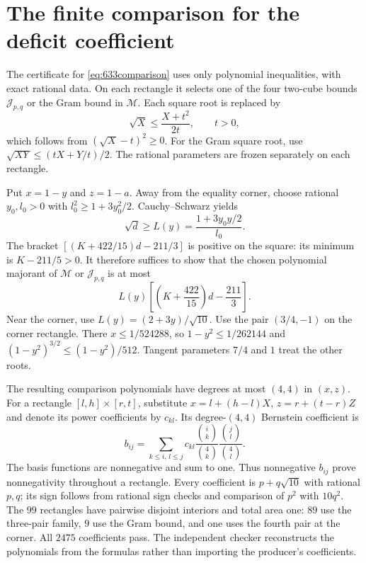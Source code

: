 \documentclass[11pt]{article}
\begin{document}
\appendix
\section{The finite comparison for the deficit coefficient}\label{app:633}
The certificate for \eqref{eq:633comparison} uses only polynomial inequalities, with exact rational data. On each rectangle it selects one of the four two-cube bounds $\mathcal J_{p,q}$ or the Gram bound in $\mathcal M$. Each square root is replaced by
\begin{equation*}
 \sqrt X\le\frac{X+t^2}{2t},\qquad t>0,
\end{equation*}
which follows from $(\sqrt X-t)^2\ge0$. For the Gram square root, use $\sqrt{XY}\le(tX+Y/t)/2$. The rational parameters are frozen separately on each rectangle.

Put $x=1-y$ and $z=1-a$. Away from the equality corner, choose rational $y_0,l_0>0$ with $l_0^2\ge1+3y_0^2/2$. Cauchy--Schwarz yields
\begin{equation*}
 \sqrt d\ge L(y)=\frac{1+3y_0y/2}{l_0}.
\end{equation*}
The bracket $[(K+422/15)d-211/3]$ is positive on the square: its minimum is $K-211/5>0$. It therefore suffices to show that the chosen polynomial majorant of $\mathcal M$ or $\mathcal J_{p,q}$ is at most
\begin{equation*}
 L(y)\left[\left(K+\frac{422}{15}\right)d-\frac{211}{3}\right].
\end{equation*}
Near the corner, use $L(y)=(2+3y)/\sqrt{10}$. Use the pair $(3/4,-1)$ on the corner rectangle. There $x\le1/524288$, so $1-y^2\le1/262144$ and $(1-y^2)^{3/2}\le(1-y^2)/512$. Tangent parameters $7/4$ and $1$ treat the other roots.

The resulting comparison polynomials have degrees at most $(4,4)$ in $(x,z)$. For a rectangle $[l,h]\times[r,t]$, substitute $x=l+(h-l)X$, $z=r+(t-r)Z$ and denote its power coefficients by $c_{kl}$. Its degree-$(4,4)$ Bernstein coefficient is
\begin{equation*}
 b_{ij}=\sum_{k\le i,\,l\le j}c_{kl}
 \frac{\binom{i}{k}}{\binom{4}{k}}
 \frac{\binom{j}{l}}{\binom{4}{l}}.
\end{equation*}
The basis functions are nonnegative and sum to one. Thus nonnegative $b_{ij}$ prove nonnegativity throughout a rectangle. Every coefficient is $p+q\sqrt{10}$ with rational $p,q$; its sign follows from rational sign checks and comparison of $p^2$ with $10q^2$. The $99$ rectangles have pairwise disjoint interiors and total area one: $89$ use the three-pair family, $9$ use the Gram bound, and one uses the fourth pair at the corner. All $2475$ coefficients pass. The independent checker reconstructs the polynomials from the formulas rather than importing the producer's coefficients.
\end{document}
